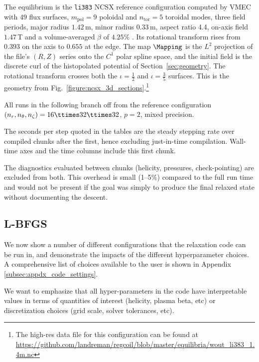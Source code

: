 \documentclass[%
 reprint,
 superscriptaddress,
 amsmath,amssymb,
 aps, nofootinbib, floatfix]{revtex4-2}
\begin{document}
The equilibrium is the \texttt{li383} NCSX reference configuration computed by {VMEC} with $49$ flux surfaces, $m_{\mathrm{pol}} = 9$ poloidal and $n_{\mathrm{tor}} = 5$ toroidal modes, three field periods, major radius $1.42\,$m, minor radius $0.33\,$m, aspect ratio 4.4, on-axis field $1.47\,$T and a volume-averaged $\beta$ of $4.25\%$ \cite{Zarnstorff2001}. Its rotational transform rises from $0.393$ on the axis to $0.655$ at the edge. The map $\Mapping$ is the $L^2$ projection of the file's $(R, Z)$ series onto the $C^1$ polar spline space, and the initial field is the discrete curl of the histopolated potential of Section~\ref{sec:geometry}. The rotational transform crosses both the $\iota = \frac{1}{2}$ and $\iota = \frac{3}{5}$ surfaces. This is the geometry from Fig.~\ref{figure:ncsx_3d_sections}.\footnote{The high-res data file for this configuration can be found at \url{https://github.com/landreman/regcoil/blob/master/equilibria/wout_li383_1.4m.nc}}

All runs in the following branch off from the reference configuration $(n_r, n_\theta, n_\zeta) = 16\ttimes32\ttimes32$, $p = 2$, mixed precision.

\begin{remark}
    The seconds per step quoted in the tables are the steady stepping rate over compiled chunks after the first, hence excluding just-in-time compilation. Wall-time axes and the time columns include this first chunk. 
    
    The diagnostics evaluated between chunks (helicity, pressures, check-pointing) are excluded from both. This overhead is small (1--5\%) compared to the full run time and would not be present if the goal was simply to produce the final relaxed state without documenting the descent.
    \end{remark}

\subsection{L-BFGS}
\label{sec:hyperparameter_sweeps}

We now show a number of different configurations that the relaxation code can be run in, and demonstrate the impacts of the different hyperparameter choices. A comprehensive list of choices available to the user is shown in Appendix \ref{subsec:appdx_code_settings}.   

We want to emphasize that all hyper-parameters in the code have interpretable values in terms of quantities of interest (helicity, plasma beta, etc) or discretization choices (grid scale, solver tolerances, etc). 
\end{document}
